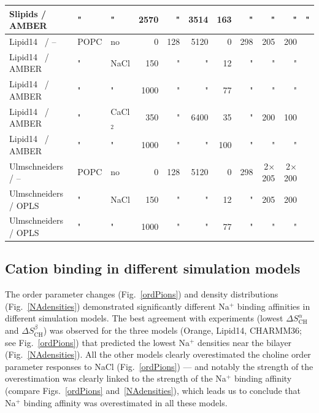 \documentclass[twoside,twocolumn,9pt]{article}
\begin{document}
\begin{table}[!p]
\begin{minipage}[t]{\textwidth}
\begin{tabular}{l l l r r r r r r r c}
  Slipids\cite{jambeck12} / AMBER\cite{beglov94,roux96} &   " & " & 2570 & " 		& 3514 &  163 & " & " & " & "  \\
  \hline
  Lipid14~\cite{dickson14} / --                        &   POPC & no 		& 0		& 128	& 5120 	& 0 & 298 & 205 & 200 &~\citenum{lipid14POPC0mMNaClfiles}  \\
  Lipid14~\cite{dickson14} / AMBER\cite{aqvist90}   &   " & NaCl & 150	& " 		& " 		& 12 & " & " & " &~\citenum{lipid14POPC150mMNaClfiles}  \\
  Lipid14~\cite{dickson14} / AMBER\cite{aqvist90}   &   " & " 	& 1000 	& " 		& " 		& 77 & " & " & " &~\citenum{lipid14POPC1000mMNaClfiles}  \\
  Lipid14~\cite{dickson14} / AMBER\cite{aqvist90}   &   " & CaCl$_2$ & 350 & " 		& 6400 	& 35 & " & 200 & 100 &~\citenum{lipid14POPC350mMCaClfiles}  \\
  Lipid14~\cite{dickson14} / AMBER\cite{aqvist90}   &   " & " 	& 1000 	& " 		& " 		& 100 & " & " & " &~\citenum{lipid14POPC1000mMCaClfiles}  \\
  \hline
  Ulmschneiders~\cite{Ulmschneider09} / --                           		& POPC 	& no 		& 0		& 128 & 5120 	& 0 & 298 & 2$\times$205 & 2$\times$200 &~\citenum{ulmschneiderPOPC0mMNaClfiles}  \\
  Ulmschneiders~\cite{Ulmschneider09} / OPLS\cite{aqvist90}	&   " 		& NaCl 	& 150 	& " 	  & " 		& 12 & " & 205 & 200 &~\citenum{ulmschneiderPOPC150mMNaClfiles}  \\
  Ulmschneiders~\cite{Ulmschneider09} / OPLS\cite{aqvist90}	&   " 		& " 		& 1000  	& " 	  & " 		& 77 & " & " & " &~\citenum{ulmschneiderPOPC1000mMNaClfiles}  \\
\end{tabular}
\end{minipage}
\end{table}







\subsection{Cation binding in different simulation models}

The order parameter changes (Fig.~\ref{ordPions}) and density distributions (Fig.~\ref{NAdensities})
demonstrated significantly different Na$^+$ binding affinities in different simulation models.
The best agreement with experiments (lowest $\Delta S_\mathrm{CH}^\alpha$ and $\Delta S_\mathrm{CH}^\beta$) was observed for the three models (Orange, Lipid14, CHARMM36; see Fig.~\ref{ordPions}) that predicted the lowest Na$^+$ densities 
near the bilayer (Fig.~\ref{NAdensities}).
All the other models clearly overestimated the choline order parameter 
responses to NaCl (Fig.~\ref{ordPions}) --- and notably
the strength of the overestimation was clearly linked to the strength of the
Na$^+$ binding affinity (compare Figs.~\ref{ordPions} and~\ref{NAdensities}),
which leads us to conclude that Na$^+$ binding affinity was overestimated in all these models.
\end{document}

